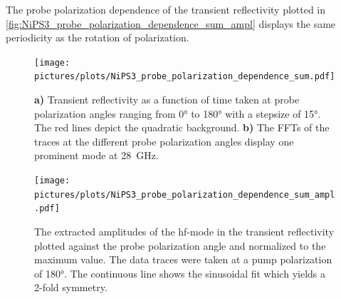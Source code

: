 The probe polarization dependence of the transient reflectivity plotted in \autoref{fig:NiPS3_probe_polarization_dependence_sum_ampl} displays the same periodicity as the rotation of polarization.
\begin{figure}[hbt!]
    \centering
    \texttt{[image: pictures/plots/NiPS3\_probe\_polarization\_dependence\_sum.pdf]} \vspace{-0.3cm}
    \caption{\textbf{a)} Transient reflectivity as a function of time taken at probe polarization angles ranging from 0° to 180° with a stepsize of 15°. The red lines depict the quadratic background. \textbf{b)} The FFTs of the traces at the different probe polarization angles display one prominent mode at \qty{28}{GHz}.}
    \label{fig:NiPS3_probe_polarization_dependence_sum}
\end{figure}
\begin{figure}[hbt!]
    \centering  
    \texttt{[image: pictures/plots/NiPS3\_probe\_polarization\_dependence\_sum\_ampl.pdf]} \vspace{-0.3cm}
    \caption{The extracted amplitudes of the hf-mode in the transient reflectivity plotted against the probe polarization angle and normalized to the maximum value. The data traces were taken at a pump polarization of 180°. The continuous line shows the sinusoidal fit which yields a 2-fold symmetry.}
    \label{fig:NiPS3_probe_polarization_dependence_sum_ampl}
\end{figure}
\FloatBarrier

